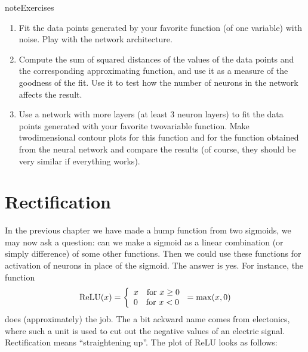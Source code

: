 \documentclass[letterpaper,10pt,english]{jupyterBook}
\begin{document}
\begin{sphinxadmonition}{note}{Exercises}
\begin{enumerate}
%
\item {} 
\sphinxAtStartPar
Fit the data points generated by your favorite function (of one variable) with noise. Play with the network architecture.

\item {} 
\sphinxAtStartPar
Compute the sum of squared distances of the values of the data points and the corresponding approximating function, and use it as a measure of the goodness of the fit. Use it to test how the number of neurons in the network affects the result.

\item {} 
\sphinxAtStartPar
Use a network with more layers (at least 3 neuron layers) to fit the data points generated with your favorite two\sphinxhyphen{}variable function. Make two\sphinxhyphen{}dimensional contour plots for this function and for the function obtained from the neural network and compare the results (of course, they should be very similar if everything works).

\end{enumerate}
\end{sphinxadmonition}


\chapter{Rectification}
\label{\detokenize{docs/rectification:rectification}}\label{\detokenize{docs/rectification::doc}}
\sphinxAtStartPar
In the previous chapter we have made a hump function from two sigmoids, we may now ask a question: can we make a sigmoid  as a linear combination (or simply difference) of some other functions. Then we could use these functions for activation of neurons in place of the sigmoid. The answer is yes. For instance, the  function
\begin{equation*}
\begin{split}
{\rm ReLU}(x) = \left \{ \begin{array}{l} x {\rm ~~~ for~} x \ge 0 \\
                                          0 {\rm ~~~ for~} x < 0 \end{array}    \right . = {\rm max}(x,0)
\end{split}
\end{equation*}
\sphinxAtStartPar
does (approximately) the job. The a bit ackward name comes from electonics, where such a unit is used to cut out the negative values of an electric signal. Rectification means “straightening up”. The plot of ReLU looks as follows:
\end{document}
